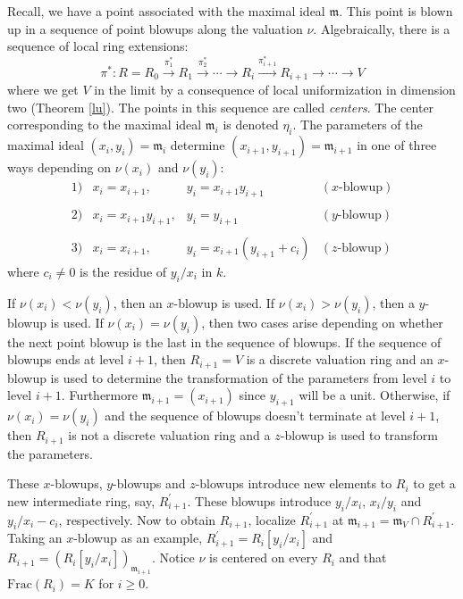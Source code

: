 \documentclass[11pt]{amsart}
\theoremstyle{definition}
\begin{document}
Recall, we have a point associated with the maximal ideal $\mathfrak{m}$. This point is blown up in a sequence of point blowups along the valuation $\nu$. Algebraically, there is a sequence of local ring extensions:
\begin{equation*}
\pi^{*}: R=R_0 \xrightarrow{\pi_1^*} R_1 \xrightarrow{\pi_2^*} \cdots \rightarrow R_i \xrightarrow{\pi_{i+1}^*} R_{i+1} \rightarrow \cdots \rightarrow V
\end{equation*}
where we get $V$ in the limit by a consequence of local uniformization in dimension two (Theorem \ref{lu}).
The points in this sequence are called {\it centers}. The center corresponding to the maximal ideal $\mathfrak{m}_i$ is denoted $\eta_i$. The parameters of the maximal ideal $(x_i,y_i)=\mathfrak{m}_i$ determine $(x_{i+1},y_{i+1})=\mathfrak{m}_{i+1}$ in one of three ways depending on $\nu(x_i)$ and $\nu(y_i)$:
\begin{equation*}
\begin{array}{llll}
1) & x_{i} = x_{i+1}, & y_{i} = x_{i+1}y_{i+1} & (x\text{-blowup})
\\\\
2) & x_{i} = x_{i+1}y_{i+1}, & y_{i}=y_{i+1} & (y\text{-blowup})
\\\\
3) & x_{i} = x_{i+1}, & y_{i} = x_{i+1}\left(y_{i+1}+c_i\right) & (z\text{-blowup})
\end{array}
\end{equation*}
where $c_i\neq 0$ is the residue of $y_{i}/x_{i}$ in $k$.

If $\nu(x_i)<\nu(y_i)$, then an $x$-blowup is used. If $\nu(x_i)>\nu(y_i)$, then a $y$-blowup is used. If $\nu(x_i)=\nu(y_i)$, then two cases arise depending on whether the next point blowup is the last in the sequence of blowups. If the sequence of blowups ends at level $i+1$, then $R_{i+1}=V$ is a discrete valuation ring and an $x$-blowup is used to determine the transformation of the parameters from level $i$ to level $i+1$. Furthermore $\mathfrak{m}_{i+1}=(x_{i+1})$ since $y_{i+1}$ will be a unit. Otherwise, if $\nu(x_i)=\nu(y_i)$ and the sequence of blowups doesn't terminate at level $i+1$, then $R_{i+1}$ is not a discrete valuation ring and a $z$-blowup is used to transform the parameters.

These $x$-blowups, $y$-blowups and $z$-blowups introduce new elements to $R_i$ to get a new intermediate ring, say, $R_{i+1}^{'}$. These blowups introduce $y_i/x_i$, $x_i/y_i$ and $y_i/x_i-c_i$, respectively. Now to obtain $R_{i+1}$, localize $R_{i+1}^{'}$ at $\mathfrak{m}_{i+1}=\mathfrak{m}_V \cap R_{i+1}^{'}$. Taking an $x$-blowup as an example, $R_{i+1}^{'} = R_i[y_i/x_i]$ and $R_{i+1}=\left(R_i[y_i/x_i]\right)_{\mathfrak{m}_{i+1}}$. Notice $\nu$ is centered on every $R_i$ and that $\text{Frac}(R_i)=K$ for $i\geq 0$.
\end{document}
